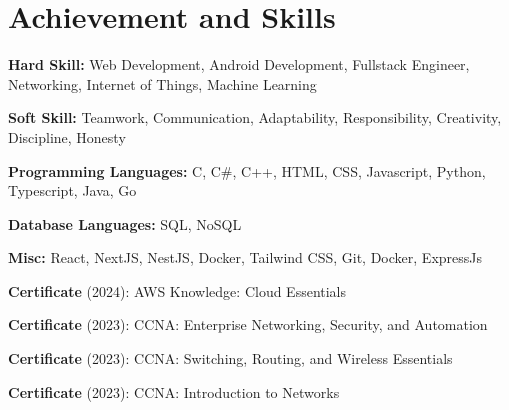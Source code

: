 \documentclass[../main.tex]{subfiles}
\begin{document}
\section{Achievement and Skills}

\begin{highlights}
	\item \textbf{Hard Skill:} Web Development, Android Development, Fullstack Engineer, Networking, Internet of Things, Machine Learning
	\item \textbf{Soft Skill:} Teamwork, Communication, Adaptability, Responsibility, Creativity, Discipline, Honesty
	\item \textbf{Programming Languages:} C, C\#, C++, HTML, CSS, Javascript, Python, Typescript, Java, Go
	\item \textbf{Database Languages:} SQL, NoSQL
	\item \textbf{Misc:} React, NextJS, NestJS, Docker, Tailwind CSS, Git, Docker, ExpressJs
	\item \textbf{Certificate} (2024): AWS Knowledge: Cloud Essentials
	\item \textbf{Certificate} (2023): CCNA: Enterprise Networking, Security, and Automation
	\item \textbf{Certificate} (2023): CCNA: Switching, Routing, and Wireless Essentials
	\item \textbf{Certificate} (2023): CCNA: Introduction to Networks
\end{highlights}
\end{document}
